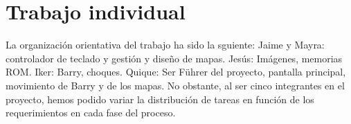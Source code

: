 \documentclass[11pt, a4paper, spanish, openright, twoside]{book}
\begin{document}
\section{Trabajo individual}
La organización orientativa del trabajo ha sido la sguiente:
Jaime y Mayra: controlador de teclado y gestión y diseño de mapas.
Jesús: Imágenes, memorias ROM.
Iker: Barry, choques.
Quique: Ser Führer del proyecto, pantalla principal, movimiento de Barry y de los mapas.
No obstante, al ser cinco integrantes en el proyecto, hemos podido variar la distribución de tareas en función de los requerimientos en cada fase del proceso. 
\end{document}
